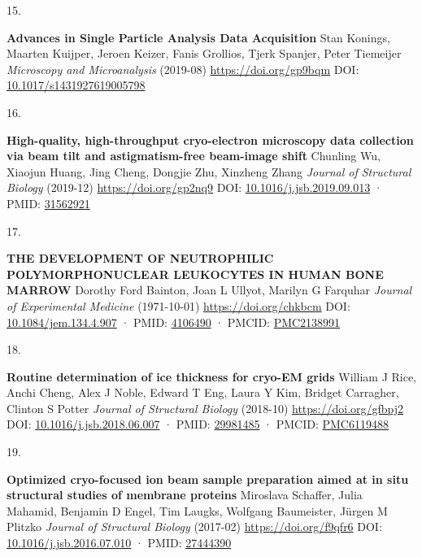 \documentclass[
]{article}
\newlength{\cslhangindent}
\newlength{\csllabelwidth}
\newlength{\cslentryspacingunit} %
\newenvironment{CSLReferences}[2] %
 {%
  \setlength{\parindent}{0pt}
  \ifodd #1
  \let\oldpar\par
  \def\par{\hangindent=\cslhangindent\oldpar}
  \fi
  \setlength{\parskip}{#2\cslentryspacingunit}
 }%
 {}
\newcommand{\CSLBlock}[1]{#1\hfill\break}
\newcommand{\CSLLeftMargin}[1]{\parbox[t]{\csllabelwidth}{#1}}
\newcommand{\CSLRightInline}[1]{\parbox[t]{\linewidth - \csllabelwidth}{#1}\break}
\begin{document}
\begin{CSLReferences}{0}{0}
\leavevmode{}%
\CSLLeftMargin{15. }%
\CSLRightInline{\textbf{Advances in Single Particle Analysis Data Acquisition}
\CSLBlock{Stan Konings, Maarten Kuijper, Jeroen Keizer, Fanis Grollios, Tjerk Spanjer, Peter Tiemeijer} \emph{Microscopy and Microanalysis} (2019-08) \url{https://doi.org/gp9bqm}
\CSLBlock{DOI: \href{https://doi.org/10.1017/s1431927619005798}{10.1017/s1431927619005798}}}

\leavevmode{}%
\CSLLeftMargin{16. }%
\CSLRightInline{\textbf{High-quality, high-throughput cryo-electron microscopy data collection via beam tilt and astigmatism-free beam-image shift}
\CSLBlock{Chunling Wu, Xiaojun Huang, Jing Cheng, Dongjie Zhu, Xinzheng Zhang} \emph{Journal of Structural Biology} (2019-12) \url{https://doi.org/gp2nq9}
\CSLBlock{DOI: \href{https://doi.org/10.1016/j.jsb.2019.09.013}{10.1016/j.jsb.2019.09.013} · PMID: \href{https://www.ncbi.nlm.nih.gov/pubmed/31562921}{31562921}}}

\leavevmode{}%
\CSLLeftMargin{17. }%
\CSLRightInline{\textbf{THE DEVELOPMENT OF NEUTROPHILIC POLYMORPHONUCLEAR LEUKOCYTES IN HUMAN BONE MARROW}
\CSLBlock{Dorothy Ford Bainton, Joan L Ullyot, Marilyn G Farquhar} \emph{Journal of Experimental Medicine} (1971-10-01) \url{https://doi.org/chkbcm}
\CSLBlock{DOI: \href{https://doi.org/10.1084/jem.134.4.907}{10.1084/jem.134.4.907} · PMID: \href{https://www.ncbi.nlm.nih.gov/pubmed/4106490}{4106490} · PMCID: \href{https://www.ncbi.nlm.nih.gov/pmc/articles/PMC2138991}{PMC2138991}}}

\leavevmode{}%
\CSLLeftMargin{18. }%
\CSLRightInline{\textbf{Routine determination of ice thickness for cryo-EM grids}
\CSLBlock{William J Rice, Anchi Cheng, Alex J Noble, Edward T Eng, Laura Y Kim, Bridget Carragher, Clinton S Potter} \emph{Journal of Structural Biology} (2018-10) \url{https://doi.org/gfbpj2}
\CSLBlock{DOI: \href{https://doi.org/10.1016/j.jsb.2018.06.007}{10.1016/j.jsb.2018.06.007} · PMID: \href{https://www.ncbi.nlm.nih.gov/pubmed/29981485}{29981485} · PMCID: \href{https://www.ncbi.nlm.nih.gov/pmc/articles/PMC6119488}{PMC6119488}}}

\leavevmode{}%
\CSLLeftMargin{19. }%
\CSLRightInline{\textbf{Optimized cryo-focused ion beam sample preparation aimed at in situ structural studies of membrane proteins}
\CSLBlock{Miroslava Schaffer, Julia Mahamid, Benjamin D Engel, Tim Laugks, Wolfgang Baumeister, Jürgen M Plitzko} \emph{Journal of Structural Biology} (2017-02) \url{https://doi.org/f9qfr6}
\CSLBlock{DOI: \href{https://doi.org/10.1016/j.jsb.2016.07.010}{10.1016/j.jsb.2016.07.010} · PMID: \href{https://www.ncbi.nlm.nih.gov/pubmed/27444390}{27444390}}}


\end{CSLReferences}
\end{document}

